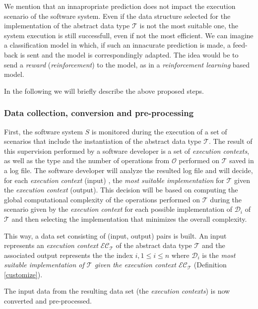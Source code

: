 We mention that an innapropriate prediction does not impact the execution scenario of the software system. Even if the data structure selected for the implementation of the abstract data type $\mathcal{T}$ is not the most suitable one, the system execution is still successfull, even if  not the most efficient. We can imagine a classification model in which, if such an innacurate prediction is made, a feed-back is sent and the model is correspondingly adapted. The idea would be to send a \emph{reward} (\emph{reinforcement}) to the model, as in a \emph{reinforcement learning} \cite{sutton} based model.   

In the following we will briefly describe the above proposed steps. 

\subsubsection{Data collection, conversion and pre-processing}\label{col}

First, the software system $S$ is monitored during the execution of a set of scenarios that include the instantiation of the abstract data type $\mathcal{T}$. The result of this supervision performed by a software developer is a set of \emph{execution contexts}, as well as the type and the number of operations from $\mathcal{O}$ performed on $\mathcal{T}$ saved in a log file. 
The software developer will analyze the resulted log file and will decide, for each \emph{execution context} (input) , the \emph{most suitable implementation} for $\mathcal{T}$ given the \emph{execution context} (output). This decision will be based on computing the global computational complexity of the operations performed on $\mathcal{T}$ during the scenario given by the \emph{execution context} for each possible implementation of $\mathcal{D}_i$ of $\mathcal{T}$ and then selecting the implementation that minimizes the overall complexity.

This way, a data set consisting of (input, output) pairs is built. An input represents an \emph{execution context} $\mathcal{EC}_\mathcal{T}$ of the abstract data type $\mathcal{T}$ and the associated output represents the  the index $i, 1 \leq i \leq n$ where $\mathcal{D}_i$ is the \emph{most suitable implementation of $\mathcal{T}$ given the execution context $\mathcal{EC}_\mathcal{T}$} (Definition \ref{customize}).

The input data from the resulting data set (the \emph{execution contexts}) is now converted and pre-processed. 

